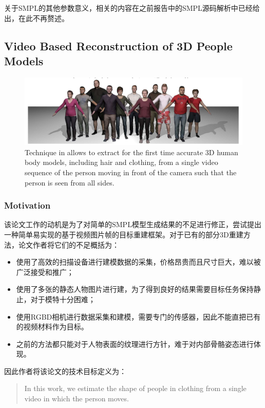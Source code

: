 \documentclass{article}
\begin{document}
关于SMPL的其他参数意义，相关的内容在之前报告中的SMPL源码解析中已经给出，在此不再赘述。

\subsection{Video Based Reconstruction of 3D People Models}

\begin{figure}[H]
    \centering
    \includegraphics[width=16cm]{figure/paper1.png}
    \caption{Technique in \cite{paper2} allows to extract for the first time accurate 3D human body models, including hair and clothing, from a single video sequence of the person moving in front of the camera such that the person is seen from all sides.}
    \label{paper1_titlefigure}
\end{figure}

\subsubsection{Motivation}
该论文工作的动机是为了对简单的SMPL模型生成结果的不足进行修正，尝试提出一种简单易实现的基于视频图片帧的目标重建框架。对于已有的部分3D重建方法，论文作者将它们的不足概括为：

\begin{itemize}
    \item 使用了高效的扫描设备进行建模数据的采集，价格昂贵而且尺寸巨大，难以被广泛接受和推广；
    \item 使用了多张的静态人物图片进行建，为了得到良好的结果需要目标任务保持静止，对于模特十分困难；
    \item 使用RGBD相机进行数据采集和建模，需要专门的传感器，因此不能直把已有的视频材料作为目标。
    \item 之前的方法都只能对于人物表面的纹理进行方针，难于对内部骨骼姿态进行体现。
\end{itemize}

因此作者将该论文的技术目标定义为：

\begin{quote}
    In this work, we estimate the shape of people in clothing from a single video in which the person moves.
\end{quote}
\end{document}
